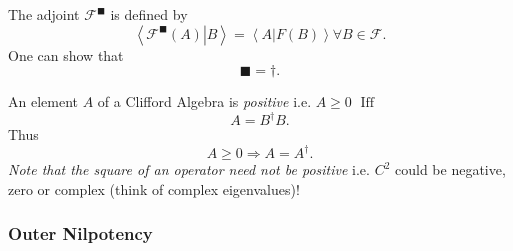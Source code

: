 \documentclass[aps,preprint]{revtex4}%
\begin{document}
The adjoint $\mathcal{F}^{\blacksquare}$ is defined by%
\begin{equation}
\left\langle \left.  \mathcal{F}^{\blacksquare}\left(  A\right)  \right\vert
B\right\rangle =\left\langle \left.  A\right\vert F\left(  B\right)
\right\rangle \forall B\in\mathcal{F}.
\end{equation}
One can show that
\begin{equation}
\blacksquare=\dagger.
\end{equation}


An element $A$ of a Clifford Algebra is \emph{positive} i.e. $A\geq0$
$\operatorname*{Iff}$
\begin{equation}
A=B^{\dagger}B.
\end{equation}
Thus
\begin{equation}
A\geq0\Rightarrow A=A^{\dagger}.
\end{equation}
\emph{Note that the square of an operator need not be positive} i.e. $C^{2}$
could be negative, zero or complex (think of complex eigenvalues)!

\subsubsection{Outer Nilpotency}
\end{document}
